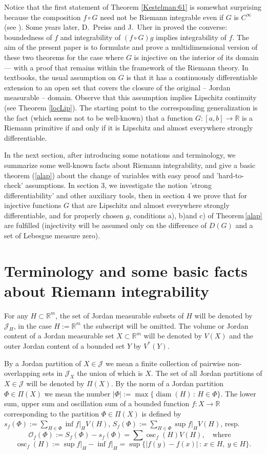 \documentclass{article}
\newcommand{\diam}{\mathop{\mathrm{diam}}\nolimits}
\newcommand{\osc}{\mathop{\mathrm{osc}}\nolimits}
\newcommand{\R}{\ensuremath{\mathbb R}}
\newcommand{\J}{\mathscr{J}}
\newcommand{\OO}{\mathscr{O}}
\begin{document}
Notice that the first statement of Theorem \ref{Kestelman:61} is
somewhat surprising because the composition \(f\circ G\) need not
be Riemann integrable even if \(G\) is \(C^{\infty}\) (see
\cite[Example 34 in Chapter 8.]{Gelbaum:65}). Some years later,
D.~Preiss and J.~Uher in \cite{PreissUher:70} proved the converse:
boundedness of $f$ and integrability of $(f\circ G)g$ implies
integrability of $f$. The aim of the present paper is to formulate and prove
a multidimensional version of these two theorems for the case
where $G$ is injective on the interior of its domain
--- with a proof that remains within the framework of the Riemann
theory. In textbooks, the usual assumption on $G$ is that it has a continuously
differentiable extension to an open set that covers the closure of the original
-- Jordan measurable -- domain. Observe that this assumption implies Lipschitz
continuity (see Theorem \ref{locLip}). The starting point to the corresponding
generalization is the fact (which
seems not to be well-known) that a function $G:[a,b]\to\R$ is a
Riemann primitive if and only if it is Lipschitz and almost
everywhere strongly differentiable.

In the next section, after introducing some notations and
terminology, we summarize some well-known facts about Riemann
integrability, and give a basic theorem (\ref{alap}) about the
change of variables with easy proof and 'hard-to-check'
assumptions. In section 3, we investigate the notion 'strong
differentiability' and other auxiliary tools, then in section 4
we prove that for
injective functions $G$ that are Lipschitz and almost everywhere
strongly differentiable, and for properly chosen $g$, conditions
a), b)and c) of Theorem\,\ref{alap} are fulfilled (injectivity
will be assumed only on the difference of $D(G)$ and a set of
Lebesgue measure zero).

\section{Terminology and some basic facts about Riemann
integrability}\label{section2}

For any $H\subset\R^m$, the set of Jordan measurable subsets of
$H$ will be denoted by $\mathscr{J}_H$, in the case $H:=\R^m$ the
subscript will be omitted. The volume or Jordan content of a
Jordan measurable set $X\subset\R^m$ will be denoted by $ V(X)$
and the outer Jordan content of a bounded set $Y$ by $V^*(Y)$.

By a Jordan partition of $X\in\J$ we mean a finite collection of
pairwise non-over\-lap\-ping sets in $\J_X$ the union of which is $X$.
The set of all Jordan partitions of $X\in\J$ will be denoted by
$\Pi(X)$. By the norm of a Jordan partition $\Phi\in\Pi(X)$ we
mean the number $|\Phi|:=\max\{\diam(H)\,:\,H\in\Phi\}$. The lower
sum, upper sum and oscillation sum of a bounded function
$f:X\to\R$ corresponding to the partition $\Phi\in\Pi(X)$ is
defined by $s_f(\Phi):=\sum_{H\in\Phi}\inf f\vert_H V(H)$,
$S_f(\Phi):=\sum_{H\in\Phi}\sup f\vert_H V(H)$, resp.
\[\OO_f(\Phi):=S_f(\Phi)-s_f(\Phi)=\sum\osc_f(H)V(H),\quad\mbox{
where}\quad \]
\[\osc_f(H):=\sup f\vert_H-\inf f\vert_H=
\sup\{|f(y)-f(x)|\,:\,x\in H,\ y\in H\}.\]
\end{document}
